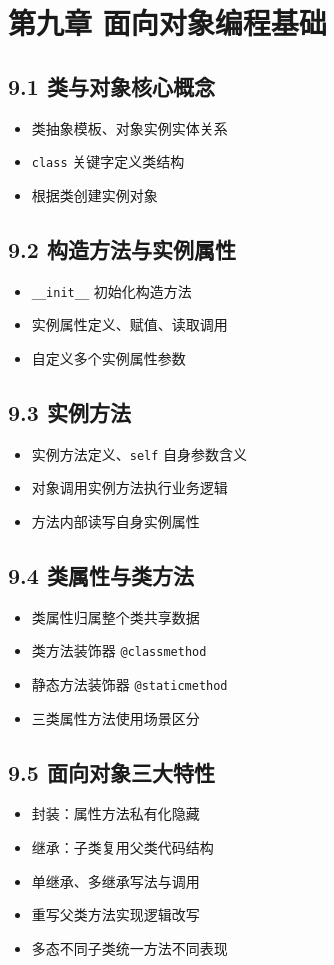 \section{第九章 面向对象编程基础}
\subsection{9.1 类与对象核心概念}
\begin{itemize}
\item 类抽象模板、对象实例实体关系
\item \texttt{class} 关键字定义类结构
\item 根据类创建实例对象
\end{itemize}

\subsection{9.2 构造方法与实例属性}
\begin{itemize}
\item \texttt{\_\_init\_\_} 初始化构造方法
\item 实例属性定义、赋值、读取调用
\item 自定义多个实例属性参数
\end{itemize}

\subsection{9.3 实例方法}
\begin{itemize}
\item 实例方法定义、\texttt{self} 自身参数含义
\item 对象调用实例方法执行业务逻辑
\item 方法内部读写自身实例属性
\end{itemize}

\subsection{9.4 类属性与类方法}
\begin{itemize}
\item 类属性归属整个类共享数据
\item 类方法装饰器 \texttt{@classmethod}
\item 静态方法装饰器 \texttt{@staticmethod}
\item 三类属性方法使用场景区分
\end{itemize}

\subsection{9.5 面向对象三大特性}
\begin{itemize}
\item 封装：属性方法私有化隐藏
\item 继承：子类复用父类代码结构
\item 单继承、多继承写法与调用
\item 重写父类方法实现逻辑改写
\item 多态不同子类统一方法不同表现
\end{itemize}

